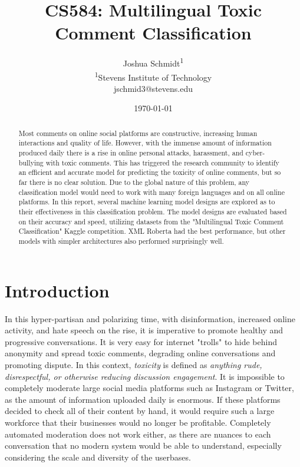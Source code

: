 \documentclass{article}
\title{CS584: Multilingual Toxic Comment Classification} %
\author{
Joshua Schmidt\textsuperscript{1}\\
\textsuperscript{1}{Stevens Institute of Technology}\\
jschmid3@stevens.edu
}
\date{\today}
\begin{document}
\maketitle
\begin{abstract}

Most comments on online social platforms are constructive, increasing human interactions and quality of life. However, with the immense amount of information produced daily there is a rise in online personal attacks, harassment, and cyber-bullying with toxic comments. This has triggered the research community to identify an efficient and accurate model for predicting the toxicity of online comments, but so far there is no clear solution. Due to the global nature of this problem, any classification model would need to work with many foreign languages and on all online platforms. In this report, several machine learning model designs are explored as to their effectiveness in this classification problem. The model designs are evaluated based on their accuracy and speed, utilizing datasets from the "Multilingual Toxic Comment Classification" Kaggle competition. XML Roberta had the best performance, but other models with simpler architectures also performed surprisingly well.

\end{abstract}

\section{Introduction}

In this hyper-partisan and polarizing time, with disinformation, increased online activity, and hate speech on the rise, it is imperative to promote healthy and progressive conversations. It is very easy for internet "trolls" to hide behind anonymity and spread toxic comments, degrading online conversations and promoting dispute. In this context, \textit{toxicity} is defined as \textit{anything rude, disrespectful, or otherwise reducing discussion engagement}. It is impossible to completely moderate large social media platforms such as Instagram or Twitter, as the amount of information uploaded daily is enormous. If these platforms decided to check all of their content by hand, it would require such a large workforce that their businesses would no longer be profitable. Completely automated moderation does not work either, as there are nuances to each conversation that no modern system would be able to understand, especially considering the scale and diversity of the userbases.
\end{document}
